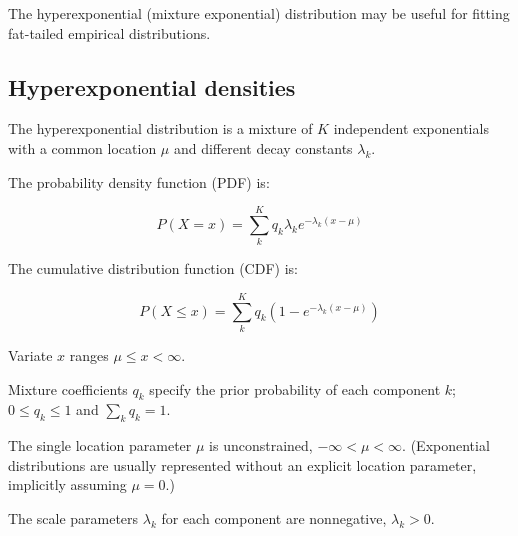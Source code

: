 
The hyperexponential (mixture exponential) distribution may be useful
for fitting fat-tailed empirical distributions. 

\subsection{Hyperexponential densities}

The hyperexponential distribution is a mixture of $K$ independent
exponentials with a common location $\mu$ and different decay
constants $\lambda_k$.

The probability density function (PDF) is:

\begin{equation}
P(X=x) = \sum_k^{K} q_k \lambda_k e^{- \lambda_k (x - \mu)}
\label{eqn:hyperexp_pdf}
\end{equation}

The cumulative distribution function (CDF) is:

\begin{equation}
P(X \leq x) = \sum_k^{K} q_k (1 - e^{- \lambda_k (x - \mu)})
\label{eqn:hyperexp_cdf}
\end{equation}

Variate $x$ ranges $\mu \leq x < \infty$.

Mixture coefficients $q_k$ specify the prior probability of each
component $k$; $0 \leq q_k \leq 1$ and $\sum_k q_k = 1$.

The single location parameter $\mu$ is unconstrained, $-\infty < \mu <
\infty$. (Exponential distributions are usually represented without an
explicit location parameter, implicitly assuming $\mu = 0$.)

The scale parameters $\lambda_k$ for each component are nonnegative,
$\lambda_k > 0$.


